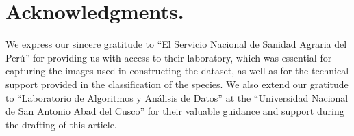 \section*{Acknowledgments.}  
We express our sincere gratitude to ``El Servicio Nacional de Sanidad Agraria del Perú'' for providing us with access to their laboratory, which was essential for capturing the images used in constructing the dataset, as well as for the technical support provided in the classification of the species. We also extend our gratitude to ``Laboratorio de Algoritmos y Análisis de Datos''  at the ``Universidad Nacional de San Antonio Abad del Cusco'' for their valuable guidance and support during the drafting of this article.
